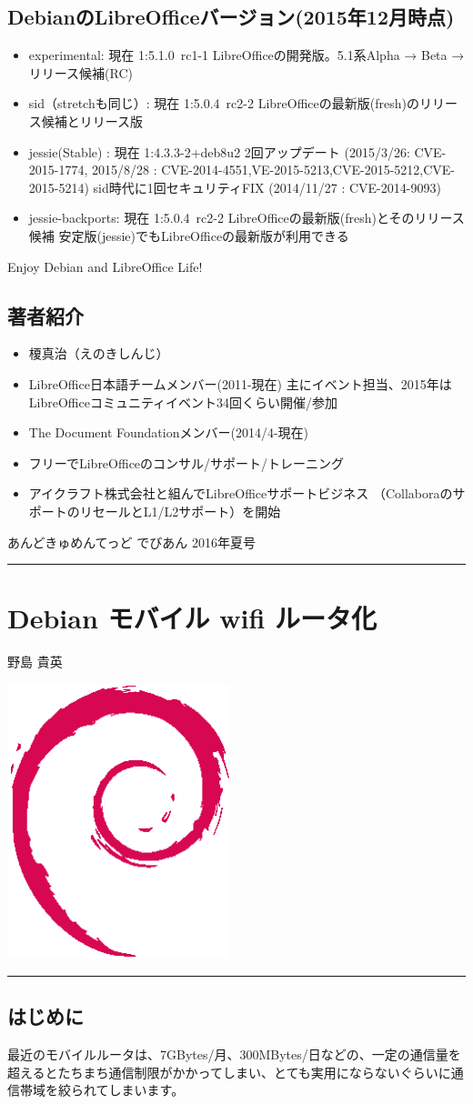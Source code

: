 \documentclass[mingoth,a4paper]{jsarticle}
\renewcommand{\dancersection}[2]{%
\newpage
あんどきゅめんてっど でびあん 2016年夏号
%
\vspace{0.1mm}\\
{\color{dancerdarkblue}\rule{\hsize}{2mm}}

%
%
\begin{minipage}[t]{0.6\hsize}
\color{dancerdarkblue}
\vspace{1cm}
\section{#1}
\hfill{}#2\\
\end{minipage}
\begin{minipage}[t]{0.4\hsize}
\vspace{-2cm}
\hfill{}\includegraphics[height=8cm]{image200502/openlogo-nd.eps}\\
\vspace{-5cm}
\end{minipage}
%
{\color{dancerlightblue}\rule{0.66\hsize}{2mm}}
%
\vspace{2cm}
}
\begin{document}
\subsection{DebianのLibreOfficeバージョン(2015年12月時点)}
\begin{itemize}
\item %
experimental: 現在 1:5.1.0~rc1-1
LibreOfficeの開発版。5.1系Alpha → Beta →リリース候補(RC)
\item %
sid（stretchも同じ）: 現在 1:5.0.4~rc2-2
LibreOfficeの最新版(fresh)のリリース候補とリリース版
\item %
jessie(Stable) : 現在 1:4.3.3-2+deb8u2
2回アップデート (2015/3/26: CVE-2015-1774, 2015/8/28 : CVE-2014-4551,VE-2015-5213,CVE-2015-5212,CVE-2015-5214)
sid時代に1回セキュリティFIX (2014/11/27 : CVE-2014-9093)
\item %
jessie-backports: 現在 1:5.0.4~rc2-2
LibreOfficeの最新版(fresh)とそのリリース候補
安定版(jessie)でもLibreOfficeの最新版が利用できる
\end{itemize}
\begin{center}
Enjoy Debian and LibreOffice Life!
\end{center}

\subsection{著者紹介}
\begin{itemize}
\item %
榎真治（えのきしんじ）
\item %
LibreOffice日本語チームメンバー(2011-現在)
主にイベント担当、2015年はLibreOfficeコミュニティイベント34回くらい開催/参加
\item %
The Document Foundationメンバー(2014/4-現在)
\item %
フリーでLibreOfficeのコンサル/サポート/トレーニング
\item %
アイクラフト株式会社と組んでLibreOfficeサポートビジネス
（CollaboraのサポートのリセールとL1/L2サポート）を開始
\end{itemize}

\dancersection{Debian モバイル wifi ルータ化}{野島 貴英}

\subsection{はじめに}

 最近のモバイルルータは、7GBytes/月、300MBytes/日などの、一定の通信量を超えるとたちまち通信制限がかかってしまい、とても実用にならないぐらいに通信帯域を絞られてしまいます。
  
\end{document}
